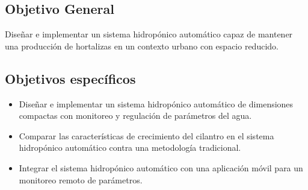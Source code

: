 \subsection*{Objetivo General}
Diseñar e implementar un sistema hidropónico automático capaz de mantener una producción de hortalizas en un contexto urbano con espacio reducido.

\subsection*{Objetivos específicos}
\begin{itemize}
	\item Diseñar e implementar un sistema hidropónico automático de dimensiones compactas con monitoreo y regulación de parámetros del agua. 
	\item Comparar las características de crecimiento del cilantro en el sistema hidropónico automático contra una metodología tradicional.
	\item Integrar el sistema hidropónico automático con una aplicación móvil para un monitoreo remoto de parámetros.
\end{itemize}
